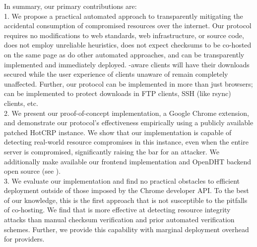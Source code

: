 In summary, our primary contributions are: \\

1. We propose a practical automated approach to transparently mitigating the
accidental consumption of compromised resources over the internet. Our protocol
requires no modifications to web standards, web infrastructure, or source code,
does not employ unreliable heuristics, does not expect checksums to be co-hosted
on the same page as do other automated approaches, and can be transparently
implemented and immediately deployed. \SYSTEM{}-aware clients will have their
downloads secured while the user experience of clients unaware of \SYSTEM{}
remain completely unaffected. Further, our protocol can be implemented in more
than just browsers; \SYSTEM{} can be implemented to protect downloads in FTP
clients, SSH (like rsync) clients, etc. \\

2. We present our proof-of-concept implementation, a Google Chrome extension,
and demonstrate our protocol's effectiveness empirically using a publicly
available patched HotCRP instance. We show that our implementation is capable of
detecting real-world resource compromises in this instance, even when the entire
server is compromised, significantly raising the bar for an attacker. We
additionally make available our frontend implementation and OpenDHT backend open
source (see ). \\

3. We evaluate our implementation and find no practical obstacles to efficient
deployment outside of those imposed by the Chrome developer API. To the best of
our knowledge, this is the first approach that is not susceptible to the
pitfalls of co-hosting. We find that \SYSTEM{} is more effective at detecting
resource integrity attacks than manual checksum verification and prior automated
verification schemes. Further, we provide this capability with marginal
deployment overhead for providers.
